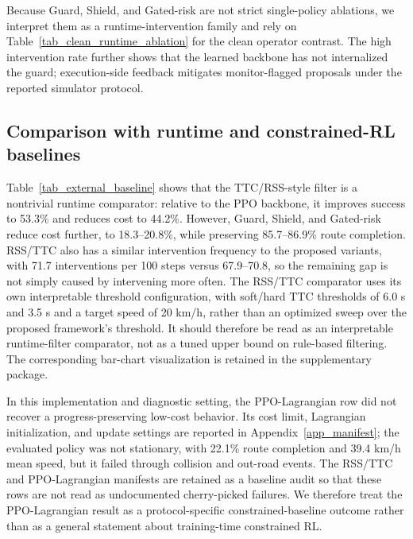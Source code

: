 \documentclass[pdflatex,sn-mathphys-ay]{sn-jnl}
\begin{document}


Because Guard, Shield, and Gated-risk are not strict single-policy ablations, we interpret them as a runtime-intervention family and rely on Table~\ref{tab_clean_runtime_ablation} for the clean operator contrast. The high intervention rate further shows that the learned backbone has not internalized the guard; execution-side feedback mitigates monitor-flagged proposals under the reported simulator protocol.

\subsection{Comparison with runtime and constrained-RL baselines}\label{sec_external}
Table~\ref{tab_external_baseline} shows that the TTC/RSS-style filter is a nontrivial runtime comparator: relative to the PPO backbone, it improves success to 53.3\% and reduces cost to 44.2\%. However, Guard, Shield, and Gated-risk reduce cost further, to 18.3--20.8\%, while preserving 85.7--86.9\% route completion. RSS/TTC also has a similar intervention frequency to the proposed variants, with 71.7 interventions per 100 steps versus 67.9--70.8, so the remaining gap is not simply caused by intervening more often. The RSS/TTC comparator uses its own interpretable threshold configuration, with soft/hard TTC thresholds of 6.0 s and 3.5 s and a target speed of 20 km/h, rather than an optimized sweep over the proposed framework's threshold. It should therefore be read as an interpretable runtime-filter comparator, not as a tuned upper bound on rule-based filtering. The corresponding bar-chart visualization is retained in the supplementary package.

In this implementation and diagnostic setting, the PPO-Lagrangian row did not recover a progress-preserving low-cost behavior. Its cost limit, Lagrangian initialization, and update settings are reported in Appendix~\ref{app_manifest}; the evaluated policy was not stationary, with 22.1\% route completion and 39.4 km/h mean speed, but it failed through collision and out-road events. The RSS/TTC and PPO-Lagrangian manifests are retained as a baseline audit so that these rows are not read as undocumented cherry-picked failures. We therefore treat the PPO-Lagrangian result as a protocol-specific constrained-baseline outcome rather than as a general statement about training-time constrained RL.


\end{document}
